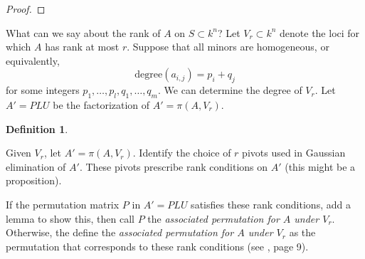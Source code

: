 \documentclass{amsart}
\theoremstyle{definition}
\newtheorem{definition}[theorem]{Definition}
\theoremstyle{remark}
\numberwithin{equation}{section}
\begin{document}
\begin{proof}
\end{proof}

What can we say about the rank of $A$ on $S \subset k^n$? Let $V_r \subset k^n$ denote the loci for which $A$ has rank at most $r$. Suppose that all minors are homogeneous, or equivalently,
\begin{equation*}
  \mathrm{degree}(a_{i,j}) = p_i + q_j
\end{equation*}
for some integers $p_1, \ldots, p_l, q_1, \ldots, q_m$.  We can determine the degree of $V_r$. Let $A' = PLU$ be the factorization of $A' = \pi(A, V_r)$.

\begin{definition}
  \begin{aroundtodo}
    Given $V_r$, let $A' = \pi(A, V_r)$. Identify the choice of $r$ pivots used in Gaussian elimination of $A'$. These pivots prescribe rank conditions on $A'$ (this might be a proposition).

    If the permutation matrix $P$ in $A' = PLU$ satisfies these rank conditions, add a lemma to show this, then call $P$ the \emph{associated permutation for $A$ under $V_r$}. Otherwise, the define the \emph{associated permutation for $A$ under $V_r$} as the permutation that corresponds to these rank conditions (see \cite{fulton1998schubert}, page 9).
  \end{aroundtodo}
\end{definition}
\end{document}
